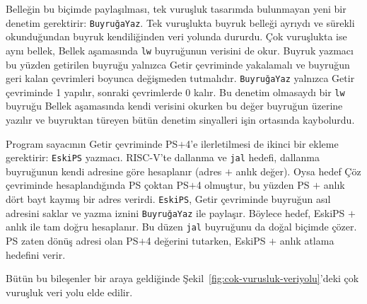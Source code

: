 Belleğin bu biçimde paylaşılması, tek vuruşluk tasarımda bulunmayan yeni bir denetim gerektirir: \texttt{BuyruğaYaz}. Tek vuruşlukta buyruk belleği ayrıydı ve sürekli okunduğundan buyruk kendiliğinden veri yolunda dururdu. Çok vuruşlukta ise aynı bellek, Bellek aşamasında \texttt{lw} buyruğunun verisini de okur. Buyruk yazmacı bu yüzden getirilen buyruğu yalnızca Getir çevriminde yakalamalı ve buyruğun geri kalan çevrimleri boyunca değişmeden tutmalıdır. \texttt{BuyruğaYaz} yalnızca Getir çevriminde 1 yapılır, sonraki çevrimlerde 0 kalır. Bu denetim olmasaydı bir \texttt{lw} buyruğu Bellek aşamasında kendi verisini okurken bu değer buyruğun üzerine yazılır ve buyruktan türeyen bütün denetim sinyalleri işin ortasında kaybolurdu.

Program sayacının Getir çevriminde PS$+$4'e ilerletilmesi de ikinci bir ekleme gerektirir: \texttt{EskiPS} yazmacı. RISC-V'te dallanma ve \texttt{jal} hedefi, dallanma buyruğunun kendi adresine göre hesaplanır (adres $+$ anlık değer). Oysa hedef Çöz çevriminde hesaplandığında PS çoktan PS$+$4 olmuştur, bu yüzden PS $+$ anlık dört bayt kaymış bir adres verirdi. \texttt{EskiPS}, Getir çevriminde buyruğun asıl adresini saklar ve yazma iznini \texttt{BuyruğaYaz} ile paylaşır. Böylece hedef, EskiPS $+$ anlık ile tam doğru hesaplanır. Bu düzen \texttt{jal} buyruğunu da doğal biçimde çözer. PS zaten dönüş adresi olan PS$+$4 değerini tutarken, EskiPS $+$ anlık atlama hedefini verir.

Bütün bu bileşenler bir araya geldiğinde Şekil~\ref{fig:cok-vurusluk-veriyolu}'deki çok vuruşluk veri yolu elde edilir.

